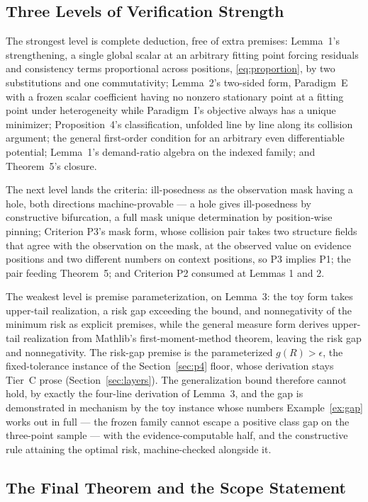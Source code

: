 \subsection{Three Levels of Verification Strength}

The strongest level is complete deduction, free of extra premises: Lemma~1's strengthening, a single global scalar at an arbitrary fitting point forcing residuals and consistency terms proportional across positions, \eqref{eq:proportion}, by two substitutions and one commutativity; Lemma~2's two-sided form, Paradigm~E with a frozen scalar coefficient having no nonzero stationary point at a fitting point under heterogeneity while Paradigm~I's objective always has a unique minimizer; Proposition~4's classification, unfolded line by line along its collision argument; the general first-order condition for an arbitrary even differentiable potential; Lemma~1's demand-ratio algebra on the indexed family; and Theorem~5's closure.

The next level lands the criteria: ill-posedness as the observation mask having a hole, both directions machine-provable --- a hole gives ill-posedness by constructive bifurcation, a full mask unique determination by position-wise pinning; Criterion P3's mask form, whose collision pair takes two structure fields that agree with the observation on the mask, at the observed value on evidence positions and two different numbers on context positions, so P3 implies P1; the pair feeding Theorem~5; and Criterion P2 consumed at Lemmas 1 and 2.

The weakest level is premise parameterization, on Lemma~3: the toy form takes upper-tail realization, a risk gap exceeding the bound, and nonnegativity of the minimum risk as explicit premises, while the general measure form derives upper-tail realization from Mathlib's first-moment-method theorem, leaving the risk gap and nonnegativity. The risk-gap premise is the parameterized $g(R) > \epsilon$, the fixed-tolerance instance of the Section~\ref{sec:p4} floor, whose derivation stays Tier~C prose (Section~\ref{sec:layers}). The generalization bound therefore cannot hold, by exactly the four-line derivation of Lemma~3, and the gap is demonstrated in mechanism by the toy instance whose numbers Example~\ref{ex:gap} works out in full --- the frozen family cannot escape a positive class gap on the three-point sample --- with the evidence-computable half, and the constructive rule attaining the optimal risk, machine-checked alongside it.

\subsection{The Final Theorem and the Scope Statement}

